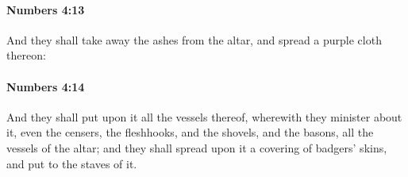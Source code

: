 		\paragraph{Numbers 4:13} %
			\label{NUMBERS-4-13}

			And they shall take away the ashes from the altar, and spread a purple cloth thereon:


		\paragraph{Numbers 4:14} %
			\label{NUMBERS-4-14}

			And they shall put upon it all the vessels thereof, wherewith they minister about it, even the censers, the fleshhooks, and the shovels, and the basons, all the vessels of the altar; and they shall spread upon it a covering of badgers’ skins, and put to the staves of it.


